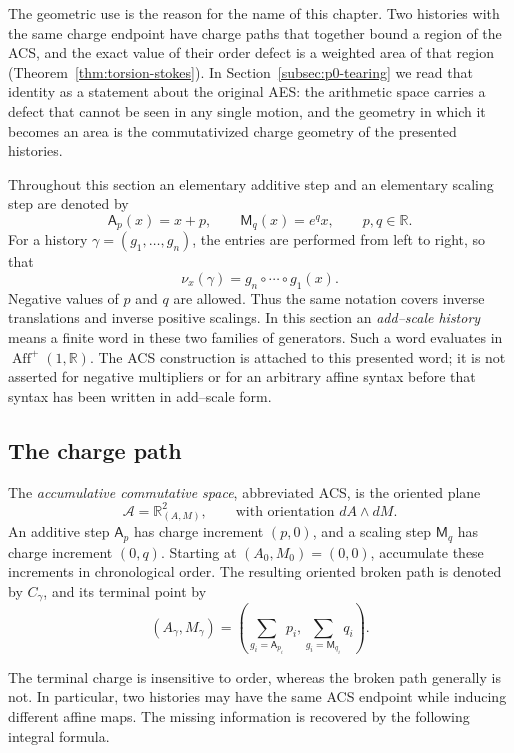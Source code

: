 The geometric use is the reason for the name of this chapter.  Two histories
with the same charge endpoint have charge paths that
together bound a region of the ACS, and the exact value of their order defect is
a weighted area of that region (Theorem~\ref{thm:torsion-stokes}).  In
Section~\ref{subsec:p0-tearing} we read that identity as a statement about the
original AES: the arithmetic space carries a defect that cannot be seen in any
single motion, and the geometry in which it becomes an area is the
commutativized charge geometry of the presented histories.

Throughout this section an elementary additive step and an elementary scaling
step are denoted by
\[
    \mathsf A_p(x)=x+p,
    \qquad
    \mathsf M_q(x)=e^q x,
    \qquad p,q\in\mathbb R.
\]
For a history \(\gamma=(g_1,\ldots,g_n)\), the entries are performed from left
to right, so that
\[
    \nu_x(\gamma)=g_n\circ\cdots\circ g_1(x).
\]
Negative values of \(p\) and \(q\) are allowed.  Thus the same notation covers
inverse translations and inverse positive scalings.
In this section an \emph{add--scale history} means a finite word in these two
families of generators.  Such a word evaluates in
\(\operatorname{Aff}^+(1,\mathbb R)\).  The ACS construction is attached to
this presented word; it is not asserted for negative multipliers or for an
arbitrary affine syntax before that syntax has been written in add--scale form.

\subsection{The charge path}

\begin{definition}
\label{def:acs}
The \emph{accumulative commutative space}, abbreviated ACS, is the oriented
plane
\[
    \mathcal A=\mathbb R^2_{(A,M)},
    \qquad \text{with orientation } dA\wedge dM.
\]
An additive step \(\mathsf A_p\) has charge increment \((p,0)\), and a scaling
step \(\mathsf M_q\) has charge increment \((0,q)\).  Starting at
\((A_0,M_0)=(0,0)\), accumulate these increments in chronological order.  The
resulting oriented broken path is denoted by \(C_\gamma\), and its terminal
point by
\[
    (A_\gamma,M_\gamma)
      =\left(\sum_{g_i=\mathsf A_{p_i}}p_i,
              \sum_{g_i=\mathsf M_{q_i}}q_i\right).
\]
\end{definition}

The terminal charge is insensitive to order, whereas the broken path generally
is not.  In particular, two histories may have the same ACS endpoint while
inducing different affine maps.  The missing information is recovered by the
following integral formula.

